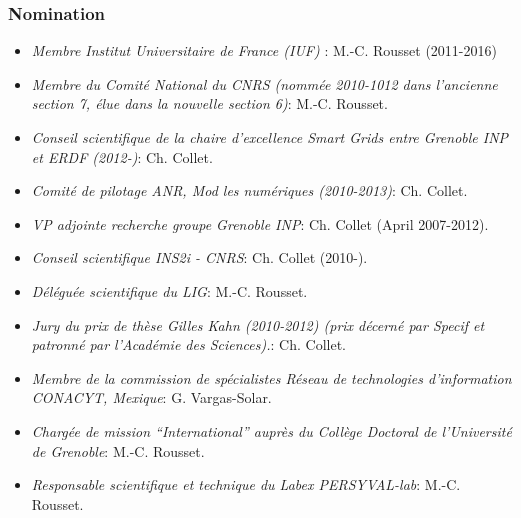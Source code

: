 \subsubsection*{Nomination}
\begin{itemize}

\setlength{\itemindent}{-0.5cm}
\setlength{\itemsep}{-0.1cm}

\item {\it Membre  Institut Universitaire de France (IUF) }: M.-C. Rousset (2011-2016)

\item {\it Membre  du Comit\'e National du CNRS (nomm\'ee 2010-1012 dans l'ancienne section 7, \'elue dans la nouvelle section 6)}: M.-C. Rousset.

\item {\it Conseil scientifique de la chaire d'excellence Smart Grids entre Grenoble INP et ERDF (2012-)}: Ch. Collet.

\item {\it Comit{\'e} de pilotage ANR, Mod les num{\'e}riques (2010-2013)}: Ch. Collet.

\item {\it VP adjointe recherche groupe Grenoble INP}: Ch. Collet (April 2007-2012).

\item {\it Conseil scientifique INS2i - CNRS}: Ch. Collet (2010-).

\item {\it D\'el\'egu\'ee scientifique du LIG}: M.-C. Rousset.

\item {\it Jury du prix de th{\`e}se Gilles Kahn (2010-2012) (prix d{\'e}cern{\'e} par Specif et patronn{\'e} par l'Acad{\'e}mie des Sciences).}: Ch. Collet.

\item {\it Membre de la commission de sp{\'e}cialistes R{\'e}seau de technologies d'information CONACYT, Mexique}: G. Vargas-Solar.

\item {\it Charg\'ee de mission ``International'' aupr\`es du Coll\`ege Doctoral de l'Universit\'e de Grenoble}: M.-C. Rousset.

\item {\it Responsable scientifique et technique du Labex PERSYVAL-lab}: M.-C. Rousset.
 



\end{itemize}


